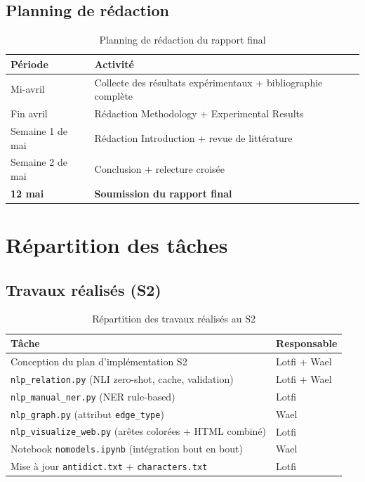 \documentclass[a4paper,11pt]{article}
\begin{document}
\subsection{Planning de rédaction}

\begin{table}[H]
  \centering
  \small
  \begin{tabular}{ll}
    \toprule
    \textbf{Période} & \textbf{Activité} \\
    \midrule
    Mi-avril          & Collecte des résultats expérimentaux + bibliographie complète \\
    Fin avril         & Rédaction Methodology + Experimental Results \\
    Semaine 1 de mai  & Rédaction Introduction + revue de littérature \\
    Semaine 2 de mai  & Conclusion + relecture croisée \\
    \textbf{12 mai}   & \textbf{Soumission du rapport final} \\
    \bottomrule
  \end{tabular}
  \caption{Planning de rédaction du rapport final}
\end{table}

\section{Répartition des tâches}

\subsection{Travaux réalisés (S2)}

\begin{table}[H]
  \centering
  \small
  \begin{tabular}{lp{2.5cm}}
    \toprule
    \textbf{Tâche} & \textbf{Responsable} \\
    \midrule
    Conception du plan d'implémentation S2                         & Lotfi + Wael \\
    \texttt{nlp\_relation.py} (NLI zero-shot, cache, validation)   & Lotfi + Wael \\
    \texttt{nlp\_manual\_ner.py} (NER rule-based)                  & Lotfi \\
    \texttt{nlp\_graph.py} (attribut \texttt{edge\_type})          & Wael \\
    \texttt{nlp\_visualize\_web.py} (arêtes colorées + HTML combiné) & Lotfi \\
    Notebook \texttt{nomodels.ipynb} (intégration bout en bout)    & Wael \\
    Mise à jour \texttt{antidict.txt} + \texttt{characters.txt}    & Lotfi \\
    \bottomrule
  \end{tabular}
  \caption{Répartition des travaux réalisés au S2}
\end{table}
\end{document}
